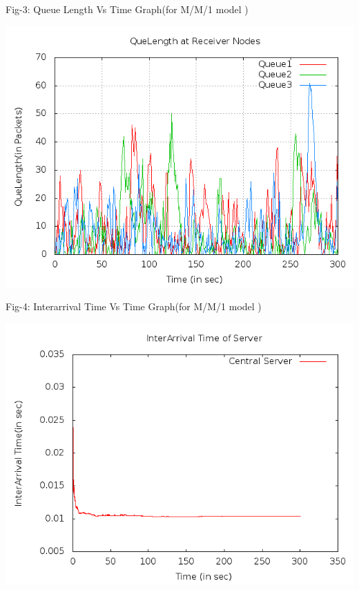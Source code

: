 \documentclass[a4paper,12pt]{report}
\begin{document}
\noindent Fig-3: Queue Length Vs Time Graph(for M/M/1 model )\\
\begin{center}
 \includegraphics[width=12 cm,height=12 cm]{../problem/queuelength.png}
\end{center}
\noindent Fig-4: Interarrival Time Vs Time Graph(for M/M/1 model )\\
\begin{center}
 \includegraphics[width=12 cm,height=12 cm]{../problem/interarrival.png}
\end{center}
\end{document}
